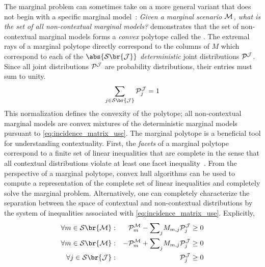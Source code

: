 \documentclass[aps, 10pt, english, twoside, pra, nofootinbib, tightenlines, longbibliography]{revtex4-1}
\renewcommand{\Events}[1]{\mathcal{S}\br{#1}} %
\begin{document}
    The marginal problem can sometimes take on a more general variant that does not begin with a specific marginal model~\cite{Abramsky_2012,Mansfield_2012,Fritz_2011}: \textit{Given a marginal scenario $\mathcal{M}$, what is the set of all non-contextual marginal models?} \citet{Pitowsky_1991} demonstrates that the set of non-contextual marginal models forms a \textit{convex} polytope called the . The extremal rays of a marginal polytope directly correspond to the columns of $M$ which correspond to each of the $\abs{\Events{\jointvar}}$ \textit{deterministic} joint distributions $\probvec^{\jointvar}$. Since all joint distributions $\probvec^{\jointvar}$ are probability distributions, their entries must sum to unity.
    \[ \sum_{j \in \Events{\jointvar}} \probvec^{\jointvar}_j = 1 \]
    This normalization defines the convexity of the polytope; all non-contextual marginal models are convex mixtures of the deterministic marginal models pursuant to \cref{eq:incidence_matrix_use}. The marginal polytope is a beneficial tool for understanding contextuality. First, the \textit{facets} of a marginal polytope correspond to a finite set of linear inequalities that are complete in the sense that all contextual distributions violate at least one facet inequality~\cite{Brunner_2013}. From the perspective of a marginal polytope, convex hull algorithms can be used to compute a representation of the complete set of linear inequalities and completely solve the marginal problem. Alternatively, one can completely characterize the separation between the space of contextual and non-contextual distributions by the system of inequalities associated with \cref{eq:incidence_matrix_use}. Explicitly,
    \begin{equation} \label{eq:halfspace_rep_incidence}
    \begin{alignedat}{2}
        \forall m \in \Events{\mscenario} :&&\quad \probvec^{\mscenario}_m - {\sum}_{j} M_{m, j} \probvec^{\jointvar}_j &\geq 0 \\
        \forall m \in \Events{\mscenario} :&&\quad -\probvec^{\mscenario}_m + {\sum}_{j} M_{m, j} \probvec^{\jointvar}_j &\geq 0 \\
        \forall j \in \Events{\jointvar} :&&\quad \probvec^{\jointvar}_j &\geq 0
    \end{alignedat}
    \end{equation}
\end{document}
